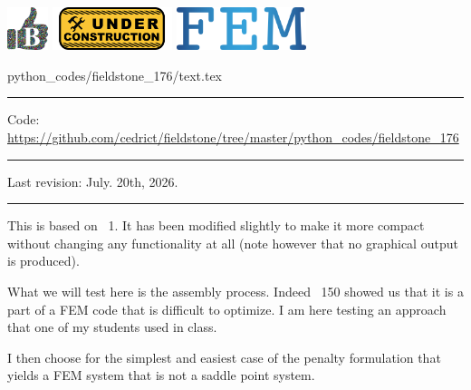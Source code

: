 \noindent
\includegraphics[height=1.25cm]{images/pictograms/benchmark}
\includegraphics[height=1.25cm]{images/pictograms/under_construction}
\includegraphics[height=1.25cm]{images/pictograms/FEM}


\begin{flushright} {\tiny {\color{gray} python\_codes/fieldstone\_176/text.tex}} \end{flushright}

%

\par\noindent\rule{\textwidth}{0.4pt}

\begin{center}
\inpython
{\small Code: \url{https://github.com/cedrict/fieldstone/tree/master/python_codes/fieldstone_176}}
\end{center}

\par\noindent\rule{\textwidth}{0.4pt}

Last revision: July. 20th, 2026.

\par\noindent\rule{\textwidth}{0.4pt}


This \stone is based on \stone~1. It has been modified slightly to make it more compact without
changing any functionality at all (note however that no graphical output is produced).

What we will test here is the assembly process. Indeed \stone~150 showed us that 
it is a part of a FEM code that is difficult to optimize. I am here testing an approach that 
one of my students used in class.

I then choose for the simplest and easiest case of the penalty formulation that yields a FEM system that 
is not a saddle point system.

